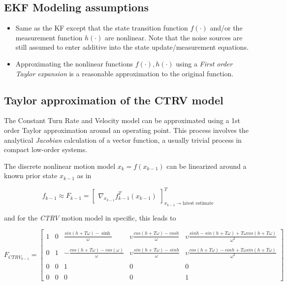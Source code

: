 \subsection{EKF Modeling assumptions}

\begin{itemize}
	\item Same as the KF except that the state transition function $f(\cdot)$ and/or the measurement function $h(\cdot)$ are nonlinear. Note that the noise sources are still assumed to enter additive into the state update/measurement equations.
	\item Approximating the nonlinear functions $f(\cdot),h(\cdot)$ using a  \emph{First order Taylor expansion} is a reasonable approximation to the original function.
\end{itemize}

\subsection{Taylor approximation of the CTRV model}

The Constant Turn Rate and Velocity model can be approximated using a 1st order Taylor approximation around an operating point. This process involves the analytical \emph{Jacobian} calculation of a vector function, a usually trivial process in compact low-order systems.


The discrete nonlinear motion model $x_{k} = f({x}_{k-1})$ can be linearized around a known prior state $x_{k-1}$ as in 




\begin{equation}
\label{eq:linearization_jacob}
f_{k-1} \approx F_{k-1} =
\begin{bmatrix}
\nabla_{x_{k-1}} f_{k-1}^{T}(x_{k-1})
\end{bmatrix}_{x_{k-1} \rightarrow\text{latest estimate}}^{T}
\end{equation}


and for the \emph{CTRV} motion model in specific, this leads to 




\begin{equation}
\label{eq:linearization_mot_model}
F_{{CTRV}_{k-1}} =
\begin{bmatrix}1 &0 &\frac{sin(h+T\omega) - \sinh}{\omega} & \upsilon \frac{cos(h+T\omega)-cosh}{\omega} & \upsilon\frac{sinh -sin(h+T\omega) + T\omega cos(h+T\omega)}{\omega^{2}}\\\\
0 &1 &-\frac{cos(h+T\omega) - cos(\omega)}{\omega} &\upsilon \frac{sin(h+T\omega)-sinh}{\omega} & \upsilon\frac{cos(h + T\omega) -cosh + T\omega sin(h+T\omega)}{\omega^{2}}\\\\
0 &0 &1 &0 &0 \\\\
0 &0 &0 &0 &1\end{bmatrix}
\end{equation}


